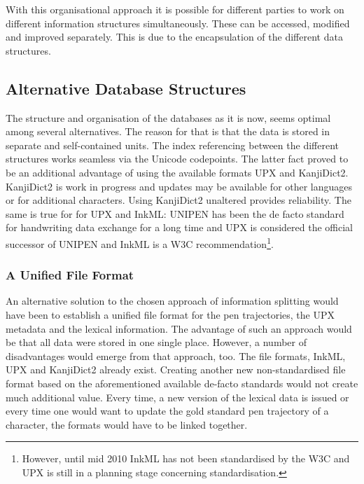 With this organisational approach it is possible for different parties to work 
on different information structures simultaneously. These can be accessed,
modified and improved separately. This is due to the encapsulation of the 
different data structures.
\newpage %
\begin{xmlcode}
  id,level,labelSrcRef,labelType,traceRef,from,to},%
                   emphstyle={[2]\color{red}},
                   caption={Sample lexicon entry for lexical data},
                   label=lst:lexiconentryEAST]
                   {chapters/codeSamples/EAST.xml}
\end{xmlcode}

\subsection{Alternative Database Structures}
\label{sec:hwre:alternativedatabasestructures}

The structure and organisation of the databases as it is now, seems optimal
among several alternatives. The reason for that is that the data is stored in
separate and self-contained units. The index referencing between the different
structures works seamless via the Unicode codepoints. The latter fact proved
to be an additional advantage of using the available formats UPX and
KanjiDict2. KanjiDict2 is work in progress and updates may be available 
for other languages or for additional characters. 
Using KanjiDict2 unaltered provides reliability.
The same is true for for UPX and InkML: UNIPEN has been the de facto standard
for handwriting data exchange for a long time and UPX is considered the
official successor of UNIPEN and InkML is a W3C recommendation\footnote{
However, until mid 2010 InkML has not been standardised by the W3C and
UPX is still in a planning stage concerning standardisation.}.

\subsubsection{A Unified File Format}
\label{sec:hwre:aunifiedfileformat}

An alternative solution to the chosen approach of information splitting 
would have been to establish a unified file format for the pen trajectories, 
the UPX metadata and the lexical information. 
The advantage of such an approach would be that all data were stored in one 
single place. However, a number of disadvantages would emerge from 
that approach, too.
The file formats, InkML, UPX and KanjiDict2 already exist.
Creating another new non-standardised file format based on 
the aforementioned available de-facto standards would not create much 
additional value. Every time, a new version of the lexical data is issued or 
every time one would want to update the gold standard pen trajectory 
of a character, the formats would have to be linked together. 

